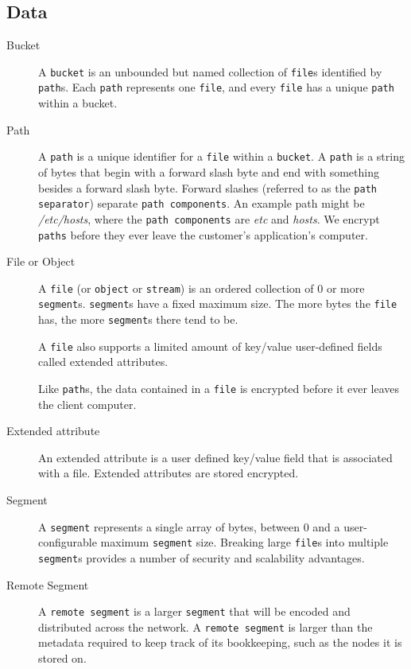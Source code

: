 \documentclass[11pt,fleqn,openany]{book}
\newcommand{\x}[1]{{\tt #1}} \newcommand{\code}[1]{{\em #1}}
\begin{document}
\subsection{Data}

\begin{description}
\item[Bucket] A \x{bucket} is an unbounded but named
collection of \x{file}s identified by \x{path}s. Each \x{path} represents one
\x{file}, and every \x{file} has a unique \x{path} within a bucket.

\item[Path] A \x{path} is a unique identifier for a \x{file} within a
\x{bucket}. A \x{path} is a string of bytes that begin with a forward
slash byte and end with something besides a forward slash byte. Forward
slashes (referred to as the \x{path separator}) separate \x{path components}.
An example path might be \code{/etc/hosts}, where the \x{path components} are
\code{etc} and \code{hosts}.
We encrypt \x{paths} before they ever leave the customer's application's
computer.

\item[File or Object] A \x{file} (or \x{object} or \x{stream}) is an ordered
collection of 0 or more \x{segment}s. \x{segment}s have a fixed maximum size.
The more bytes the \x{file} has, the more \x{segment}s there tend to be.

A \x{file} also supports a limited amount of key/value user-defined fields
called extended attributes.

Like \x{path}s, the data contained in a \x{file} is encrypted before it ever
leaves the client computer.

\item[Extended attribute] An extended attribute is a user defined key/value
field that is associated with a file. Extended attributes are stored encrypted.

\item[Segment] A \x{segment} represents a single array of bytes, between 0 and a
user-configurable maximum \x{segment} size. Breaking large \x{file}s into
multiple \x{segment}s provides a number of security and scalability advantages.

\item[Remote Segment] A \x{remote segment} is a larger \x{segment} that will be
encoded and distributed across the network. A \x{remote segment} is larger than
the metadata required to keep track of its bookkeeping, such as the nodes it
is stored on.


\end{description}
\end{document}
